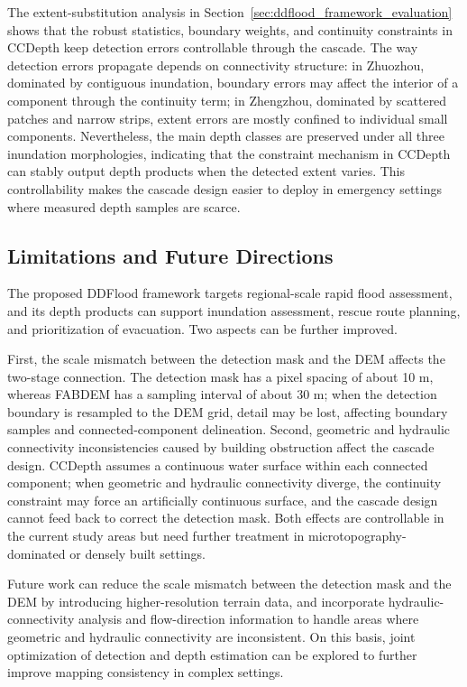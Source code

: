 \documentclass[authoryear,preprint,12pt]{elsarticle}
\begin{document}
The extent-substitution analysis in Section~\ref{sec:ddflood_framework_evaluation} shows that the robust statistics, boundary weights, and continuity constraints in CCDepth keep detection errors controllable through the cascade. The way detection errors propagate depends on connectivity structure: in Zhuozhou, dominated by contiguous inundation, boundary errors may affect the interior of a component through the continuity term; in Zhengzhou, dominated by scattered patches and narrow strips, extent errors are mostly confined to individual small components. Nevertheless, the main depth classes are preserved under all three inundation morphologies, indicating that the constraint mechanism in CCDepth can stably output depth products when the detected extent varies. This controllability makes the cascade design easier to deploy in emergency settings where measured depth samples are scarce.

\subsection{Limitations and Future Directions}

The proposed DDFlood framework targets regional-scale rapid flood assessment, and its depth products can support inundation assessment, rescue route planning, and prioritization of evacuation. Two aspects can be further improved.

First, the scale mismatch between the detection mask and the DEM affects the two-stage connection. The detection mask has a pixel spacing of about 10 m, whereas FABDEM has a sampling interval of about 30 m; when the detection boundary is resampled to the DEM grid, detail may be lost, affecting boundary samples and connected-component delineation. Second, geometric and hydraulic connectivity inconsistencies caused by building obstruction affect the cascade design. CCDepth assumes a continuous water surface within each connected component; when geometric and hydraulic connectivity diverge, the continuity constraint may force an artificially continuous surface, and the cascade design cannot feed back to correct the detection mask. Both effects are controllable in the current study areas but need further treatment in microtopography-dominated or densely built settings.

Future work can reduce the scale mismatch between the detection mask and the DEM by introducing higher-resolution terrain data, and incorporate hydraulic-connectivity analysis and flow-direction information to handle areas where geometric and hydraulic connectivity are inconsistent. On this basis, joint optimization of detection and depth estimation can be explored to further improve mapping consistency in complex settings.
\end{document}
